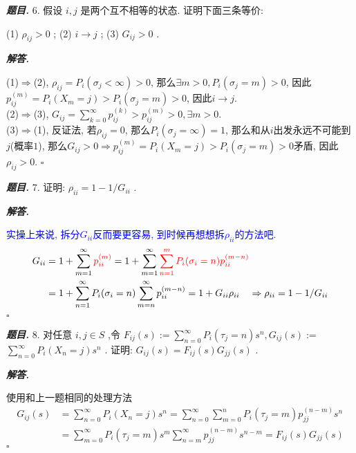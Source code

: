 \documentclass[10pt, a4paper, oneside]{ctexart}
\newenvironment{problem}{\begin{framed}\par\noindent\textbf{\textit{题目. }}}{\end{framed}\par}
\newenvironment{solution}{%
  \par\noindent\textbf{\textit{解答. }}\ignorespaces
}{%
  \hfill\ensuremath{\square}\par %
}
\begin{document}
\begin{problem}
 6. 假设 \( i,j \) 是两个互不相等的状态. 证明下面三条等价:

(1) \( {\rho }_{ij} > 0 \) ; (2) \( i \rightarrow  j \) ; (3) \( {G}_{ij} > 0 \) .
\end{problem}

\begin{solution}
    (1)$\Rightarrow$(2), $\rho_{ij}=P_i(\sigma_j<\infty)>0$, 那么$\exists m>0, P_i(\sigma_j=m)>0$, 因此$p_{ij}^{(m)}=P_i(X_m=j)>P_i(\sigma_j=m)>0$, 因此$i\to j$.\\
    (2)$\Rightarrow$(3), $G_{ij}=\sum_{k=0}^{\infty}p_{ij}^{(k)}>p_{ij}^{(m)}>0,\exists m>0$.\\
    (3)$\Rightarrow$(1), 反证法, 若$\rho_{ij}=0$, 那么$P_i(\sigma_j=\infty)=1$, 那么和从$i$出发永远不可能到$j$(概率$1$), 那么$G_{ij}>0\Rightarrow p_{ij}^{(m)}=P_i(X_m=j)>P_i(\sigma_j=m)>0$矛盾, 因此$\rho_{ij}>0$.
\end{solution}

\begin{problem}
    7. 证明: \( {\rho }_{ii} = 1 - 1/{G}_{ii} \) .
\end{problem}

\begin{solution}
    \textcolor{blue}{实操上来说, 拆分$G_{ii}$反而要更容易, 到时候再想想拆$\rho_{ii}$的方法吧.}
    \begin{align*}
        G_{ii}&=1+\sum_{m=1}^{\infty}\textcolor{red}{p_{ii}^{(m)}}=1+\sum_{m=1}^{\infty}\textcolor{red}{\sum_{n=1}^{m}P_{i}(\sigma_i=n)p_{ii}^{(m-n)}}\\
        &=1+\sum_{n=1}^{\infty}P_{i}(\sigma_i=n)\sum_{m=n}^{\infty}p_{ii}^{(m-n)}=1+G_{ii}\rho_{ii}\quad\Rightarrow{\rho }_{ii} = 1 - 1/{G}_{ii}
    \end{align*}
\end{solution}

\begin{problem}
    8. 对任意 \( i,j \in  S \) ,令 \( {F}_{ij}\left( s\right)  \mathrel{\text{:=}} \mathop{\sum }\limits_{{n = 0}}^{\infty }{P}_{i}\left( {{\tau }_{j} = n}\right) {s}^{n},{G}_{ij}\left( s\right)  :=  \) \( \mathop{\sum }\limits_{{n = 0}}^{\infty }{P}_{i}\left( {{X}_{n} = j}\right) {s}^{n} \) . 证明: \( {G}_{ij}\left( s\right)  = {F}_{ij}\left( s\right) {G}_{jj}\left( s\right)  \) .
\end{problem}

\begin{solution}
    使用和上一题相同的处理方法 
    \begin{align*}
        G_{ij}(s)&=\sum_{n=0}^{\infty}P_i(X_n=j)s^n=\sum_{n=0}^{\infty}\sum_{m=0}^{n}P_i(\tau_j=m)p_{jj}^{(n-m)}s^n\\
        &=\sum_{m=0}^{\infty}P_i(\tau_j=m)s^m\sum_{n=m}^{\infty}p_{jj}^{(n-m)}s^{n-m}=F_{ij}(s)G_{jj}(s)
    \end{align*}
\end{solution}
\end{document}
